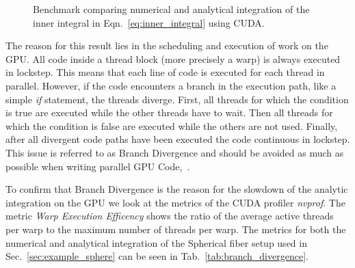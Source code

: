 \begin{figure}[!htbp]
  \centering
  \caption[Benchmark computing inner integral on GPU.]{Benchmark comparing numerical and analytical integration of the inner integral in Eqn.~\eqref{eq:inner_integral} using CUDA.}
  \label{fig:cuda_num_vs_anal}
\end{figure}

The reason for this result lies in the scheduling and execution of work on the GPU. All code inside a thread block (more precisely a warp) is always executed in lockstep. This means that each line of code is executed for each thread in parallel. However, if the code encounters a branch in the execution path, like a simple \emph{if} statement, the threads diverge. First, all threads for which the condition is true are executed while the other threads have to wait. Then all threads for which the condition is false are executed while the others are not used. Finally, after all divergent code paths have been executed the code continuous in lockstep. This issue is referred to as Branch Divergence and should be avoided as much as possible when writing parallel GPU Code,~\cite{CudaBestPracticeGuide}.

To confirm that Branch Divergence is the reason for the slowdown of the analytic integration on the GPU we look at the metrics of the CUDA profiler \emph{nvprof}. The metric \emph{Warp Execution Efficency} shows the ratio of the average active threads per warp to the maximum number of threads per warp. The metrics for both the numerical and analytical integration of the Spherical fiber setup used in Sec.~\ref{sec:example_sphere} can be seen in Tab.~\ref{tab:branch_divergence}.

